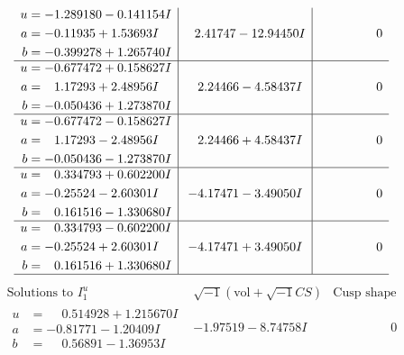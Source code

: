 \documentclass[1p]{elsarticle_modified}
\theoremstyle{definition}
\newcommand{\I}{\sqrt{-1}}
\begin{document}
$$\begin{array}{c|c|c}
\begin{aligned}
u &= -1.289180 - 0.141154 I \\
a &= -0.11935 + 1.53693 I \\
b &= -0.399278 + 1.265740 I\end{aligned}
 & \phantom{-}2.41747 - 12.94450 I & \phantom{-0.000000 } 0 \\ \hline\begin{aligned}
u &= -0.677472 + 0.158627 I \\
a &= \phantom{-}1.17293 + 2.48956 I \\
b &= -0.050436 + 1.273870 I\end{aligned}
 & \phantom{-}2.24466 - 4.58437 I & \phantom{-0.000000 } 0 \\ \hline\begin{aligned}
u &= -0.677472 - 0.158627 I \\
a &= \phantom{-}1.17293 - 2.48956 I \\
b &= -0.050436 - 1.273870 I\end{aligned}
 & \phantom{-}2.24466 + 4.58437 I & \phantom{-0.000000 } 0 \\ \hline\begin{aligned}
u &= \phantom{-}0.334793 + 0.602200 I \\
a &= -0.25524 - 2.60301 I \\
b &= \phantom{-}0.161516 - 1.330680 I\end{aligned}
 & -4.17471 - 3.49050 I & \phantom{-0.000000 } 0 \\ \hline\begin{aligned}
u &= \phantom{-}0.334793 - 0.602200 I \\
a &= -0.25524 + 2.60301 I \\
b &= \phantom{-}0.161516 + 1.330680 I\end{aligned}
 & -4.17471 + 3.49050 I & \phantom{-0.000000 } 0\\
 \hline 
 \end{array}$$\newpage$$\begin{array}{c|c|c}  
\text{Solutions to }I^u_{1}& \I (\text{vol} + \sqrt{-1}CS) & \text{Cusp shape}\\
 \hline 
\begin{aligned}
u &= \phantom{-}0.514928 + 1.215670 I \\
a &= -0.81771 - 1.20409 I \\
b &= \phantom{-}0.56891 - 1.36953 I\end{aligned}
 & -1.97519 - 8.74758 I & \phantom{-0.000000 } 0 \\ \hline\begin{aligned}

\end{aligned}
\end{array}$$
\end{document}
